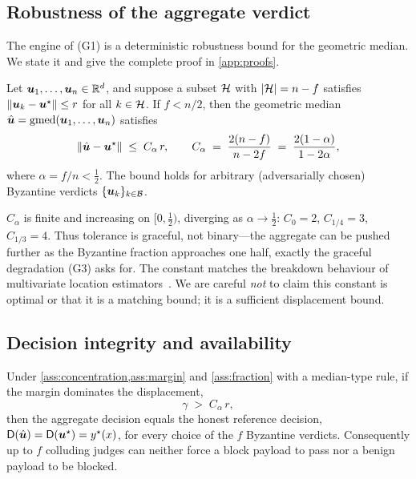 \subsection{Robustness of the aggregate verdict}
The engine of (G1) is a deterministic robustness bound for the geometric median. We state
it and give the complete proof in \cref{app:proofs}.

\begin{lemma}
\label{lem:gmedrobust}
Let $\bm{u}_1,\dots,\bm{u}_n\in\mathbb{R}^d$, and suppose a subset $\mathcal{H}$ with $|\mathcal{H}|=n-f$
satisfies $\lVert\bm{u}_k-\bm{u}^{\star}\rVert\le r$ for all $k\in\mathcal{H}$. If $f<n/2$, then the
geometric median $\hat{\bm{u}}=\operatorname{gmed}(\bm{u}_1,\dots,\bm{u}_n)$ satisfies
\begin{equation}
  \lVert \hat{\bm{u}}-\bm{u}^{\star}\rVert \;\le\; C_\alpha\, r,
  \qquad C_\alpha \;=\; \frac{2(n-f)}{\,n-2f\,}\;=\;\frac{2(1-\alpha)}{1-2\alpha},
  \label{eq:gmedbound}
\end{equation}
where $\alpha=f/n<\tfrac12$. The bound holds for arbitrary (adversarially chosen)
Byzantine verdicts $\{\bm{u}_k\}_{k\in\mathcal{B}}$.
\end{lemma}

\begin{remark}
$C_\alpha$ is finite and increasing on $[0,\tfrac12)$, diverging as $\alpha\to\tfrac12$:
$C_0=2$, $C_{1/4}=3$, $C_{1/3}=4$. Thus tolerance is graceful, not binary—the aggregate
can be pushed further as the Byzantine fraction approaches one half, exactly the graceful
degradation (G3) asks for. The constant matches the breakdown behaviour of multivariate
location estimators~\cite{lopuhaa1991breakdown,minsker2015geometric}. We are careful
\emph{not} to claim this constant is optimal or that it is a matching bound; it is a
sufficient displacement bound.
\end{remark}

\subsection{Decision integrity and availability}
\begin{theorem}
\label{thm:integrity}
Under \cref{ass:concentration,ass:margin} and \cref{ass:fraction} with a median-type rule,
if the margin dominates the displacement,
\begin{equation}
  \gamma \;>\; C_\alpha\, r ,
  \label{eq:integritycond}
\end{equation}
then the aggregate decision equals the honest reference decision,
$\mathsf{D}(\hat{\bm{u}})=\mathsf{D}(\bm{u}^{\star})=y^\star(x)$, for every choice of the $f$ Byzantine verdicts.
Consequently up to $f$ colluding judges can neither force a block payload to pass nor a
benign payload to be blocked.
\end{theorem}

